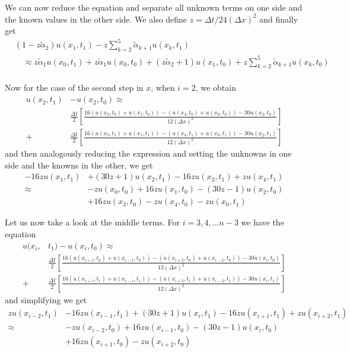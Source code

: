 \documentclass[00main.tex]{subfiles}
\begin{document}
We can now reduce the equation and separate all unknown terms on one side and the known values in the other side. We also define $ z=\Delta t/24(\Delta x)^2$ and finally get \begin{align*}
& (1-z\tilde{\alpha}_2) u(x_1, t_1) - z \sum_{k=2}^5 \tilde{\alpha}_{k+1} u(x_k, t_1)\\
 &\quad \approx z \tilde{\alpha}_1 u(x_0, t_1) + z \tilde{\alpha}_1 u(x_0, t_0) + (z\tilde{\alpha}_2 +1) u(x_1, t_0) + z\sum_{k=2}^5 \tilde{\alpha}_{k+1} u(x_k, t_0)\\
\end{align*}

Now for the case of the second step in $x$, when $i=2$, we obtain \begin{align*}
u(x_2, t_1) &- u(x_2, t_0) \approx \\ 
& \frac{\Delta t}{2} \left[ \frac{16(u(x_{3},t_0) + u(x_{1}, t_0)) - (u(x_{4}, t_0) + u(x_{0}, t_0)) - 30 u(x_2, t_0)}{12 (\Delta x)^2} \right]\\  +&  \frac{\Delta t}{2} \left[ \frac{16(u(x_{3},t_1) + u(x_{1}, t_1)) - (u(x_{4}, t_1) + u(x_{0}, t_1)) - 30 u(x_2, t_1)}{12 (\Delta x)^2} \right]
\end{align*} and then analogously reducing the expression and setting the unknowns in one side and the knowns in the other, we get \begin{align*}
  - 16 z u(x_{1}, t_1) & + (30z + 1) u(x_2, t_1) - 16z u(x_{3}, t_1) + zu(x_{4}, t_1)\\
\approx & -z u(x_{0}, t_0) +16 z u(x_{1}, t_0) - (30z-1) u(x_2, t_0) \\ & + 16z u(x_{3}, t_0) -zu(x_{4}, t_0) - z u(x_{0}, t_1)
\end{align*}

Let us now take a look at the middle terms. For $i = 3, 4, \hdots n-3$ we have the equation \begin{align*}
u(x_i,& t_1) - u(x_i, t_0) \approx\\ 
&\frac{\Delta t}{2} \left[ \frac{16(u(x_{i+1},t_0) + u(x_{i-1}, t_0)) - (u(x_{i+2}, t_0) + u(x_{i-2}, t_0)) - 30 u(x_i, t_0)}{12 (\Delta x)^2} \right]\\ 
 + & \frac{\Delta t}{2} \left[ \frac{16(u(x_{i+1},t_1) + u(x_{i-1}, t_1)) - (u(x_{i+2}, t_1) + u(x_{i-2}, t_1)) - 30 u(x_i, t_1)}{12 (\Delta x)^2} \right]
\end{align*} and simplifying we get \begin{align*}
 z u(x_{i-2}, t_1) &- 16 z u(x_{i-1}, t_1) + (30z + 1) u(x_i, t_1) - 16z u(x_{i+1}, t_1) + zu(x_{i+2}, t_1)\\
   \approx & -z u(x_{i-2}, t_0) +16 z u(x_{i-1}, t_0) - (30z-1) u(x_i, t_0) \\ &  + 16z u(x_{i+1}, t_0) -zu(x_{i+2}, t_0)
\end{align*}
\end{document}
